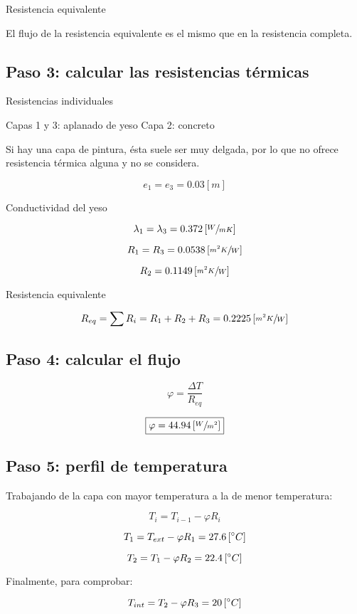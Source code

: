 \documentclass[11pt]{article}
\begin{document}
Resistencia equivalente

El flujo de la resistencia equivalente es el mismo que en la resistencia completa.

\subsection{Paso 3: calcular las resistencias térmicas}

Resistencias individuales

Capas 1 y 3: aplanado de yeso
Capa 2: concreto

Si hay una capa de pintura, ésta suele ser muy delgada, por lo que no ofrece resistencia térmica alguna y no se considera.

\[ e_1 = e_3 = 0.03 \left[ m \right] \]

Conductividad del yeso

\[ \lambda _1 = \lambda _3 = 0.372 \left[ \sfrac{ W }{ m K } \right] \]

\[ R_1 = R_3 = 0.0538 \left[ \sfrac{ m ^ 2 K }{ W } \right] \]

\[ R_2 = 0.1149 \left[ \sfrac{ m ^ 2 K }{ W } \right] \]

Resistencia equivalente

\[ R_{ eq } = \sum{ R_i } = R_1 + R_2 + R_3 = 0.2225 \left[ \sfrac{ m ^ 2 K }{ W } \right] \]

\subsection{Paso 4: calcular el flujo}

\[ \varphi = \frac{ \Delta T }{ R_{ eq } } \]

\[ \boxed{ \varphi = 44.94 \left[ \sfrac{ W }{ m ^ 2 } \right] } \]

\subsection{Paso 5: perfil de temperatura}

Trabajando de la capa con mayor temperatura a la de menor temperatura:

\[ T_i = T_{ i - 1 } - \varphi R_i \]

\[ T_1 = T_{ ext } - \varphi R_1 = 27.6 \left[ \degree C \right] \]

\[ T_2 = T_{ 1 } - \varphi R_2 = 22.4 \left[ \degree C \right] \]

Finalmente, para comprobar:

\[ T_{ int } = T_{ 2 } - \varphi R_3 = 20 \left[ \degree C \right] \]
\end{document}
